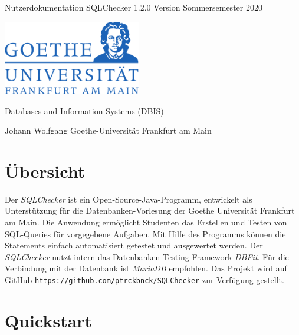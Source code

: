 \documentclass[11pt]{article}
\begin{document}
 \hypersetup{pageanchor=false}
\begin{titlepage}
	\begin{center}
		
		\vspace{6cm}
		
		{\huge Nutzerdokumentation SQLChecker 1.2.0}
		{\small Version Sommersemester 2020}
		\vspace{0.2cm}
		
		
		
		\vspace{2cm}
		\includegraphics[width=6cm]{figures/goethe}
		\vspace{2.5cm}
		
		Databases and Information Systems (DBIS)
		
		Johann Wolfgang Goethe-Universität Frankfurt am Main
		
		
	\end{center}
	\vspace*{\fill}
	
\end{titlepage}
 \hypersetup{pageanchor=true}
 
\tableofcontents
 \newpage
\section{Übersicht}
Der \textit{SQLChecker} ist ein Open-Source-Java-Programm, entwickelt als Unterstützung für die Datenbanken-Vorlesung der Goethe Universität Frankfurt am Main.
Die Anwendung ermöglicht Studenten das Erstellen und Testen von SQL-Queries für vorgegebene Aufgaben. Mit Hilfe des Programms können die Statements einfach automatisiert getestet und ausgewertet werden.
Der \textit{SQLChecker} nutzt intern das Datenbanken Testing-Framework \textit{DBFit}. Für die Verbindung mit der Datenbank ist \textit{MariaDB} empfohlen.
Das Projekt wird auf GitHub  \href{https://github.com/ptrckbnck/SQLChecker}{\texttt{https://github.com/ptrckbnck/SQLChecker}} zur Verfügung gestellt.

\section{Quickstart}
\end{document}
